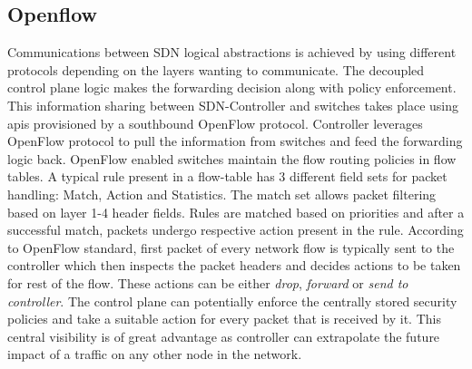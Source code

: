 \subsection{Openflow}
Communications between SDN logical abstractions is achieved by using different protocols depending on the layers wanting to communicate. The decoupled control plane logic makes the forwarding decision along with policy enforcement. This information sharing between SDN-Controller and switches takes place using apis provisioned by a southbound OpenFlow protocol.
Controller leverages OpenFlow protocol to pull the information from switches and feed the forwarding logic back. OpenFlow enabled switches maintain the flow routing policies in flow tables. A typical rule present in a flow-table has 3 different field sets for packet handling: Match, Action and Statistics. The match set allows packet filtering based on layer 1-4 header fields. Rules are matched based on priorities and after a successful match, packets undergo respective action present in the rule. According to OpenFlow standard, first packet of every network flow is typically sent to the controller which then inspects the packet headers and decides actions to be taken for rest of the flow. These actions can be either \textit{drop}, \textit{forward} or \textit{send to controller}. The control plane can potentially enforce the centrally stored security policies and take a suitable action for every packet that is received by it. This central visibility is of great advantage as controller can extrapolate the future impact of a traffic on any other node in the network.


